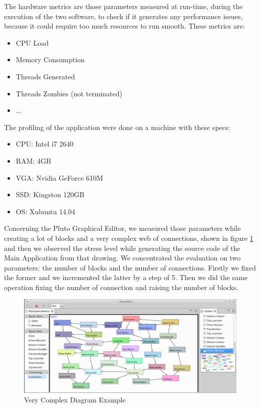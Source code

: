 The hardware metrics are those parameters measured at run-time, during the execution of the two software, to check if it generates any performance issues, because it could require too much resources to run smooth. These metrics are:

\begin{itemize}
\item CPU Load
\item Memory Consumption
\item Threads Generated
\item Threads Zombies (not terminated)
\item ...
\end{itemize}

The profiling of the application were done on a machine with these specs:

\begin{itemize}
\item CPU: Intel i7 2640
\item RAM: 4GB
\item VGA: Nvidia GeForce 610M
\item SSD: Kingston 120GB
\item OS: Xubuntu 14.04
\end{itemize}

Concerning the Pluto Graphical Editor, we measured those parameters while creating a lot of blocks and a very complex web of connections, shown in figure \ref{fig:stressDiagram} and then we observed the stress level while generating the source code of the Main Application from that drawing. We concentrated the evaluation on two parameters: the number of blocks and the number of connections. Firstly we fixed the former and we incremented the latter by a step of 5. Then we did the same operation fixing the number of connection and raising the number of blocks.

\begin{figure}[H]
  \centering
  \includegraphics[width=\linewidth]{pictures/stressDiagram.png}
  \caption{Very Complex Diagram Example}
  \label{fig:stressDiagram}
\end{figure}

